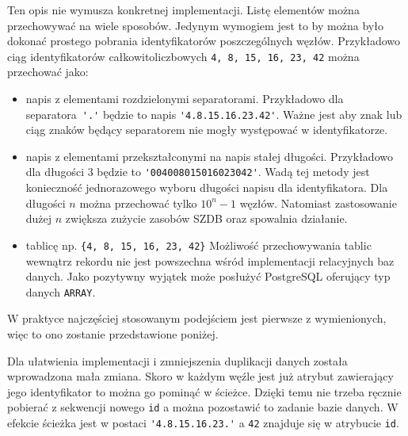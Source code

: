 Ten opis nie wymusza konkretnej implementacji.
Listę elementów można przechowywać na wiele sposobów.
Jedynym wymogiem jest to by można było dokonać prostego pobrania identyfikatorów poszczególnych węzłów.
Przykładowo ciąg identyfikatorów całkowitoliczbowych \texttt{4, 8, 15, 16, 23, 42} można przechować jako:
\begin{itemize}
 \item napis z elementami rozdzielonymi separatorami. 
    Przykładowo dla separatora~\verb|'.'| będzie to napis \verb|'4.8.15.16.23.42'|.
    Ważne jest aby znak lub ciąg znaków będący separatorem nie mogły występować w identyfikatorze.
 \item napis z elementami przekształconymi na napis stałej długości. 
    Przykładowo dla długości 3 będzie to \verb|'004008015016023042'|.
    Wadą tej metody jest konieczność jednorazowego wyboru długości napisu dla identyfikatora.
    Dla długości $n$ można przechować tylko $10^n-1$ węzłów. %
    Natomiast zastosowanie dużej $n$ zwiększa zużycie zasobów SZDB oraz spowalnia działanie.
 \item tablicę  np. \verb|{4, 8, 15, 16, 23, 42}|
    Możliwość przechowywania tablic wewnątrz rekordu nie jest powszechna wśród implementacji relacyjnych baz danych.
    Jako pozytywny wyjątek może posłużyć PostgreSQL oferujący typ danych \verb|ARRAY|.
\end{itemize}

W praktyce najczęściej stosowanym podejściem jest pierwsze z wymienionych,
więc to ono zostanie przedstawione poniżej.

Dla ułatwienia implementacji i zmniejszenia duplikacji danych została wprowadzona mała zmiana.
Skoro w każdym węźle jest już atrybut zawierający jego identyfikator to można go pominąć w ścieżce.
Dzięki temu nie trzeba ręcznie pobierać z sekwencji nowego \texttt{id} a można pozostawić to zadanie bazie danych.
W efekcie ścieżka jest w postaci \verb|'4.8.15.16.23.'| a \verb|42| znajduje się w atrybucie \verb|id|.







